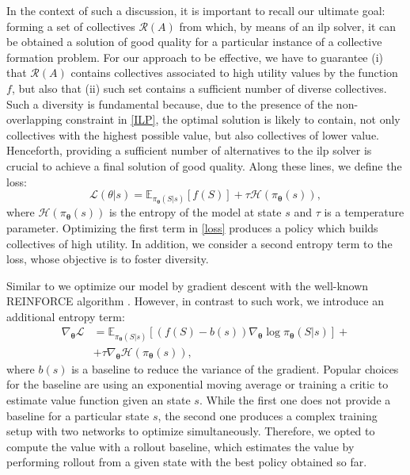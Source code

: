\documentclass{article}
\theoremstyle{definition}
\begin{document}
In the context of such a discussion, it is important to recall our ultimate goal: forming a set of collectives $\mathcal{R}(A)$ from which, by means of an \gls{ilp} solver, it can be obtained a solution of good quality for a particular instance of a collective formation problem.
For our approach to be effective, we have to guarantee (i) that $\mathcal{R}(A)$ contains collectives associated to high utility values by the function $f$, but also that (ii) such set contains a sufficient number of diverse collectives.
Such a diversity is fundamental because, due to the presence of the non-overlapping constraint in \eqref{ILP}, the optimal solution is likely to contain, not only collectives with the highest possible value, but also collectives of lower value. 
Henceforth, providing a sufficient number of alternatives to the \gls{ilp} solver is crucial to achieve a final solution of good quality.
Along these lines, we define the loss:
\begin{equation}
    \mathcal{L}(\theta|s) = \mathbb{E}_{\pi_{\boldsymbol{\theta}}(S|s)} \left[ f(S) \right] + \tau \mathcal{H}(\pi_{\boldsymbol{\theta}}(s)),
    \label{loss}
\end{equation}
where $\mathcal{H}(\pi_{\boldsymbol{\theta}}(s))$ is the entropy of the model at state $s$ and $\tau$ is a temperature parameter.
Optimizing the first term in \eqref{loss} produces a policy which builds collectives of high utility. In addition, we consider a second entropy term to the loss, whose objective is to foster diversity.

Similar to \cite{kool2018attention} we optimize our model by gradient descent with the well-known REINFORCE algorithm \cite{williams1992simple}. However, in contrast to such work, we introduce an additional entropy term:
\begin{equation}
    \begin{aligned}
        \nabla_{\boldsymbol{\theta}} \mathcal{L} &= \mathbb{E}_{\pi_{\boldsymbol{\theta}}(S | s)}  \left[ \left( f(S) - b(s) \right) \nabla_{\boldsymbol{\theta}} \log \pi_{\boldsymbol{\theta}}(S | s) \right] + \\ &+ \tau \nabla_{\boldsymbol{\theta}} \mathcal{H}(\pi_{\boldsymbol{\theta}}(s)) ,
    \end{aligned}
\end{equation}
where $b(s)$ is a baseline to reduce the variance of the gradient. Popular choices for the baseline are using an exponential moving average or training a critic to estimate value function given an state $s$. While the first one does not provide a baseline for a particular state $s$, the second one produces a complex training setup with two networks to optimize simultaneously. Therefore, we opted to compute the value with a rollout baseline, which estimates the value by performing rollout from a given state with the best policy obtained so far.
\end{document}
